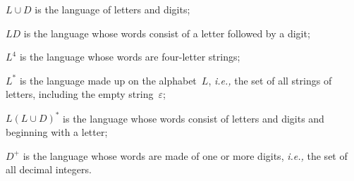 \begin{itemize*}

  \item \(L \cup D\) is the language of letters and digits;

  \item \(L D\) is the language whose words consist of a letter followed
  by a digit;

  \item \(L^{4}\) is the language whose words are four\hyp{}letter
  strings;

  \item \(L^{*}\) is the language made up on the alphabet~\(L\),
  \emph{i.e.,} the set of all strings of letters, including the empty
  string~\(\varepsilon\);

  \item \(L(L \cup D)^{*}\) is the language whose words consist of
  letters and digits and beginning with a letter;

  \item \(D^{+}\) is the language whose words are made of one or more
  digits, \emph{i.e.,} the set of all decimal integers.

\end{itemize*}
